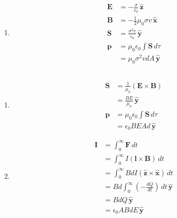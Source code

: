 \documentclass{article}
\renewcommand{\vec}[1]{\boldsymbol{\mathbf{#1}}}
\newcommand{\uvec}[1]{\hat{\vec{#1}}}
\begin{document}
\begin{enumerate}
  \item

        \begin{align*}
          \vec{E} & = -\frac{\sigma}{\epsilon_0} \,\uvec{z}    \\
          \vec{B} & = -\frac{1}{2} \mu_0 \sigma v \,\uvec{x}   \\
          \vec{S} & = \frac{\sigma^2 v}{\epsilon_0} \,\uvec{y} \\
          \vec{p} & = \mu_0 \epsilon_0 \int \vec{S} \,d \tau   \\
                  & = \mu_0 \sigma^2 v d A \,\uvec{y}
        \end{align*}
\end{enumerate}

\subsection{}

\begin{enumerate}
  \item

        \begin{align*}
          \vec{S} & = \frac{1}{\mu_0} (\vec{E} \times \vec{B}) \\
                  & = \frac{B E}{\mu_0} \,\uvec{y}             \\
          \vec{p} & = \mu_0 \epsilon_0 \int \vec{S} \,d \tau   \\
                  & = \epsilon_0 B E A d \,\uvec{y}
        \end{align*}

  \item

        \begin{align*}
          \vec{I} & = \int_0^\infty \vec{F} \,d t                                       \\
                  & = \int_0^\infty I (\vec{l} \times \vec{B}) \,d t                    \\
                  & = \int_0^\infty B d I (\uvec{z} \times \uvec{x}) \,d t              \\
                  & = B d \int_0^\infty \left(-\frac{d Q}{d t} \right) \,d t \,\uvec{y} \\
                  & = B d Q \,\uvec{y}                                                  \\
                  & = \epsilon_0 A B d E \,\uvec{y}
        \end{align*}
\end{enumerate}
\end{document}
